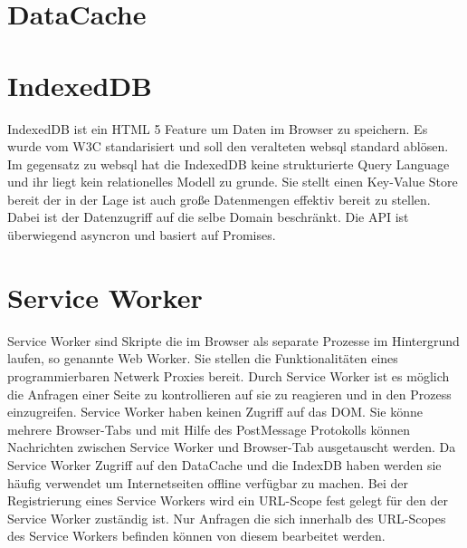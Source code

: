 \section{DataCache}


\section{IndexedDB}

IndexedDB ist ein HTML 5 Feature um Daten im Browser zu speichern. Es wurde vom W3C standarisiert\cite{w3IndexedDB} und soll den veralteten websql standard ablösen. Im gegensatz zu websql hat die IndexedDB keine strukturierte Query Language und ihr liegt kein relationelles Modell zu grunde. Sie stellt einen Key-Value Store bereit der in der Lage ist auch große Datenmengen effektiv bereit zu stellen. Dabei ist der Datenzugriff auf die selbe Domain beschränkt. Die API ist überwiegend asyncron und basiert auf Promises.

\section{Service Worker}
Service Worker sind Skripte die im Browser als separate Prozesse im Hintergrund laufen, so genannte Web Worker. Sie stellen die Funktionalitäten eines programmierbaren Netwerk Proxies bereit. Durch Service Worker ist es möglich die Anfragen einer Seite zu kontrollieren auf sie zu reagieren und in den Prozess einzugreifen.\cite{w3ServiceWorker} Service Worker haben keinen Zugriff auf das DOM. Sie könne mehrere Browser-Tabs und mit Hilfe des PostMessage Protokolls können Nachrichten zwischen Service Worker und Browser-Tab ausgetauscht werden. Da Service Worker Zugriff auf den DataCache und die IndexDB haben werden sie häufig verwendet um Internetseiten offline verfügbar zu machen. Bei der Registrierung eines Service Workers wird ein URL-Scope fest gelegt für den der Service Worker zuständig ist. Nur Anfragen die sich innerhalb des URL-Scopes des Service Workers befinden können von diesem bearbeitet werden.

